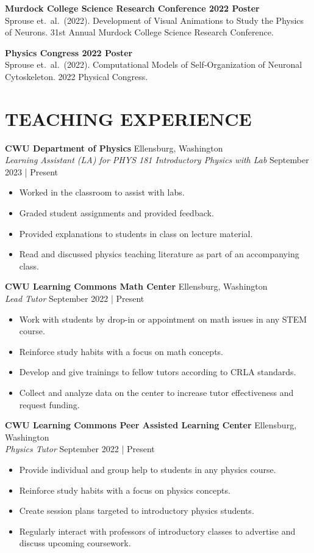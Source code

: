 \documentclass[a4paper,9pt]{extarticle}
\begin{document}
\noindent\textbf{Murdock College Science Research Conference 2022 Poster}\\
Sprouse et.\ al.\ (2022). Development of Visual Animations to Study the Physics of Neurons. 31st Annual Murdock College Science Research Conference.

\noindent\textbf{Physics Congress 2022 Poster}\\
Sprouse et.\ al.\ (2022). Computational Models of Self-Organization of Neuronal Cytoskeleton. 2022 Physical Congress.


\section*{TEACHING EXPERIENCE}
\noindent\textbf{CWU Department of Physics} \hfill Ellensburg, Washington\\
\textit{Learning Assistant (LA) for PHYS 181 Introductory Physics with Lab} \hfill September 2023 | Present
\begin{itemize}
    \item Worked in the classroom to assist with labs.
    \item Graded student assignments and provided feedback.
    \item Provided explanations to students in class on lecture material.
    \item Read and discussed physics teaching literature as part of an accompanying class.
\end{itemize}

\noindent\textbf{CWU Learning Commons Math Center} \hfill Ellensburg, Washington\\
\textit{Lead Tutor} \hfill September 2022 | Present
\begin{itemize}
    \item Work with students by drop-in or appointment on math issues in any STEM course.
    \item Reinforce study habits with a focus on math concepts.
    \item Develop and give trainings to fellow tutors according to CRLA standards.
    \item Collect and analyze data on the center to increase tutor effectiveness and request funding.
\end{itemize}

\noindent\textbf{CWU Learning Commons Peer Assisted Learning Center} \hfill Ellensburg, Washington\\
\textit{Physics Tutor} \hfill September 2022 | Present
\begin{itemize}
    \item Provide individual and group help to students in any physics course.
    \item Reinforce study habits with a focus on physics concepts.
    \item Create session plans targeted to introductory physics students.
    \item Regularly interact with professors of introductory classes to advertise and discuss upcoming coursework.
\end{itemize}
\end{document}
